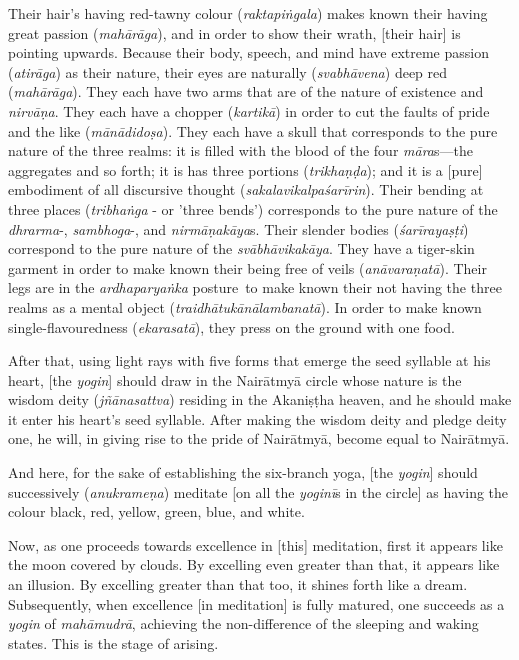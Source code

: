 \documentclass[naipra.tex]{subfiles}
\begin{document}
Their hair's having red-tawny colour (\emph{raktapiṅgala}) makes known their having great passion (\emph{mahārāga}), and in order to show their wrath, [their hair] is pointing upwards.
Because their body, speech, and mind have extreme passion (\emph{atirāga}) as their nature, their eyes are naturally (\emph{svabhāvena}) deep red (\emph{mahārāga}).
They each have two arms that are of the nature of existence and \emph{nirvāṇa}.
They each have a chopper (\emph{kartikā}) in order to cut the faults of pride and the like (\emph{mānādidoṣa}).
They each have a skull that corresponds to the pure nature of the three realms: it is filled with the blood of the four \emph{māra}s—the aggregates and so forth; it is has three portions (\emph{trikhaṇḍa}); and it is a [pure] embodiment of all discursive thought (\emph{sakalavikalpaśarīrin}).
Their bending at three places (\emph{tribhaṅga} - or 'three bends') corresponds to the pure nature of the \emph{dhrarma}-, \emph{sambhoga}-, and \emph{nirmāṇakāya}s.
Their slender bodies (\emph{śarīrayaṣṭi}) correspond to the pure nature of the \emph{svābhāvikakāya}.
They have a tiger-skin garment in order to make known their being free of veils (\emph{anāvaraṇatā}).
Their legs are \crux in the \emph{ardhaparyaṅka} posture\crux\ to make known their not having the three realms as a mental object (\emph{traidhātukānālambanatā}).
In order to make known single-flavouredness (\emph{ekarasatā}), they press on the ground with one food.

After that, using light rays with five forms that emerge the seed syllable at his heart, [the \emph{yogin}] should draw in the Nairātmyā circle whose nature is the wisdom deity (\emph{jñānasattva}) residing in the Akaniṣṭha heaven, and he should make it enter his heart's seed syllable.
After making the wisdom deity and pledge deity one, he will, in giving rise to the pride of Nairātmyā, become equal to Nairātmyā.

And here, for the sake of establishing the six-branch yoga, [the \emph{yogin}] should successively (\emph{anukrameṇa}) meditate [on all the \emph{yoginī}s in the circle] as having the colour black, red, yellow, green, blue, and white.

Now, as one proceeds towards excellence in [this] meditation, first it appears like the moon covered by clouds.
By excelling even greater than that, it appears like an illusion.
By excelling greater than that too, it shines forth like a dream.
Subsequently, when excellence [in meditation] is fully matured, one succeeds as a \emph{yogin} of \emph{mahāmudrā}, achieving the non-difference of the sleeping and waking states.
This is the stage of arising.
\end{document}
